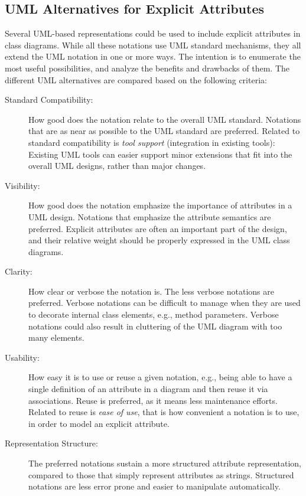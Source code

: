 \subsection{UML Alternatives for Explicit Attributes}
\label{sec:possibilities}

Several UML-based representations could be used to include
explicit attributes in class diagrams. While all these notations use UML
standard mechanisms, they all extend the UML notation in one or more ways.
The intention is to enumerate the most useful possibilities, and analyze the benefits and drawbacks of them. The different UML alternatives are compared based on the following criteria:

\begin{description}

\item[Standard Compatibility:] How good does the notation relate to the overall
  UML standard. Notations that are as near as possible to the UML standard are preferred. Related to standard compatibility is \textit{tool support} (integration in
  existing tools): Existing UML tools  \cite{case.tools} can easier support minor extensions that fit into the overall UML designs, rather than major changes.

\item[Visibility:] How good does the notation emphasize the importance of
  attributes in a UML design. Notations that emphasize the
  attribute semantics are preferred. Explicit attributes are often an
  important part of the design, and their relative weight should be properly
  expressed in the UML class diagrams.

\item[Clarity:] How clear or verbose the notation is. The less
  verbose notations are preferred. Verbose notations can be difficult to manage when they are used to decorate internal class elements, e.g., method parameters. Verbose notations could also result in cluttering of the UML diagram with too many elements.

\item[Usability:] How easy it is to use or reuse a given notation, e.g., being able to have a single definition of an attribute in a diagram and then reuse it via associations. Reuse is preferred, as it means less maintenance efforts. Related to reuse is \textit{ease of use}, that is how convenient a notation is to use, in order to model an explicit attribute.

\item [Representation Structure:] The preferred notations sustain a more structured attribute representation, compared to those that simply represent attributes as 
  strings. Structured notations are less error prone and easier to manipulate
  automatically.

\end{description}

